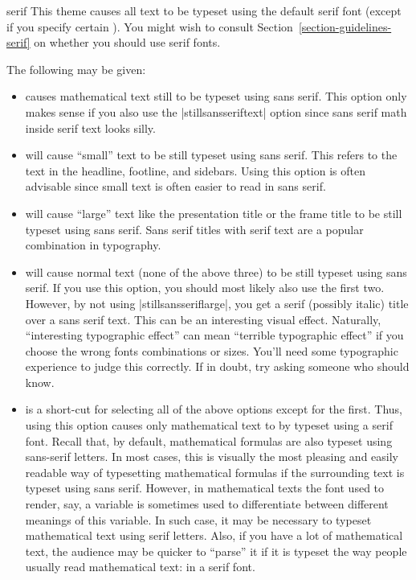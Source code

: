 \begin{fontthemeexample}{serif}
  This theme causes all text to be typeset using the default serif font (except if you specify certain ). You might wish to consult Section~\ref{section-guidelines-serif} on whether you should use serif fonts.

  The following  may be given:
  \begin{itemize}
  \item
    causes mathematical text still to be typeset using sans serif. This option only makes sense if you also use the |stillsansseriftext| option since sans serif math inside serif text looks silly.
  \item
    will cause ``small'' text to be still typeset using sans serif. This refers to the text in the headline, footline, and sidebars. Using this option is often advisable since small text is often easier to read in sans serif.
  \item
    will cause ``large'' text like the presentation title or the frame title to be still typeset using sans serif. Sans serif titles with serif text are a popular combination in typography.
  \item
    will cause normal text (none of the above three) to be still typeset using sans serif. If you use this option, you should most likely also use the first two. However, by not using |stillsansseriflarge|, you get a serif (possibly italic) title over a sans serif text. This can be an interesting visual effect. Naturally, ``interesting typographic effect'' can mean ``terrible typographic effect'' if you choose the wrong fonts combinations or sizes. You'll need some typographic experience to judge this correctly. If in doubt, try asking someone who should know.
  \item
    is a short-cut for selecting all of the above options except for the first. Thus, using this option causes only mathematical text to by typeset using a serif font. Recall that, by default, mathematical formulas are also typeset using sans-serif letters. In most cases, this is visually the most pleasing and easily readable way of typesetting mathematical formulas if the surrounding text is typeset using sans serif. However, in mathematical texts the font used to render, say, a variable is sometimes used to differentiate between different meanings of this variable. In such case, it may be necessary to typeset mathematical text using serif letters. Also, if you have a lot of mathematical text, the audience may be quicker to ``parse'' it if it is typeset the way people usually read mathematical text: in a serif font.
  \end{itemize}
\end{fontthemeexample}


